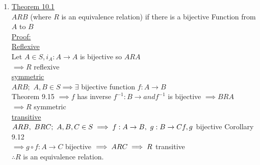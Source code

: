\documentclass[12pt]{amsart}
\begin{document}
\begin{enumerate}
\item \underline{Theorem 10.1}\\
$ARB$ (where $R$ is an equivalence relation) if there is a bijective Function from $A$ to $B$\\
\underline{Proof:}\\
\underline{Reflexive}\\
Let $A \in S, i_A: A \rightarrow A$ is bijective so $A R A$\\
$\implies R$ reflexive\\
\underline{symmetric}\\
$A R B;\,\, A,B \in S \implies \exists$ bijective function $f: A \rightarrow B$\\
Theorem 9.15 $\implies f$ has inverse $f^{-1}: B \rightarrow and f^{-1}$ is bijective $\implies BRA$\\
$\implies R$ symmetric\\
\underline{transitive}\\
$ARB,\,\, BRC;\,\, A,B,C \in S \implies f: A \rightarrow B,\,\, g: B \rightarrow C\\
f, g$ bijective Corollary 9.12\\
$\implies g \circ f : A \rightarrow C$ bijective $\implies ARC\\
\implies R$ transitive\\
$\therefore R$ is an equivalence relation.\\


\hdashrule[0.5ex][c]{\linewidth}{0.5pt}{1.5mm}



\end{enumerate}
\end{document}
